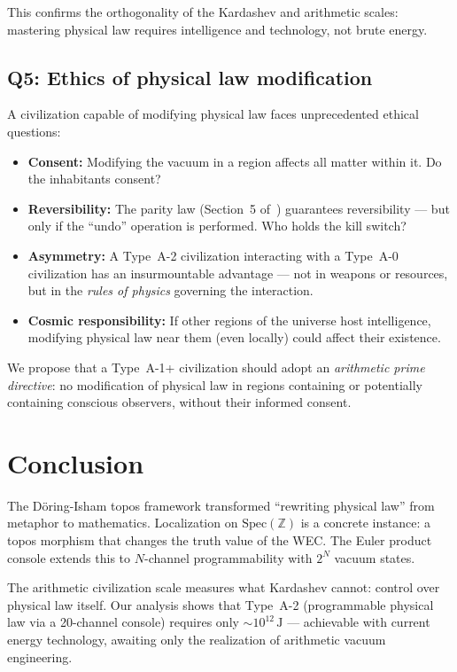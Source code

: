 \documentclass[11pt,a4paper]{article}
\newcommand{\Spec}{\mathrm{Spec}}
\begin{document}
This confirms the orthogonality of the Kardashev and arithmetic
scales: mastering physical law requires intelligence and
technology, not brute energy.

\subsection{Q5: Ethics of physical law modification}

A civilization capable of modifying physical law faces
unprecedented ethical questions:
\begin{itemize}
\item \textbf{Consent:} Modifying the vacuum in a region affects
  all matter within it. Do the inhabitants consent?
\item \textbf{Reversibility:} The parity law (Section~5 of~\cite{paper_J})
  guarantees reversibility --- but only if the ``undo'' operation
  is performed. Who holds the kill switch?
\item \textbf{Asymmetry:} A Type~A-2 civilization interacting with
  a Type~A-0 civilization has an insurmountable advantage ---
  not in weapons or resources, but in the \emph{rules of physics}
  governing the interaction.
\item \textbf{Cosmic responsibility:} If other regions of the
  universe host intelligence, modifying physical law near them
  (even locally) could affect their existence.
\end{itemize}

We propose that a Type~A-1+ civilization should adopt an
\emph{arithmetic prime directive}: no modification of physical
law in regions containing or potentially containing conscious
observers, without their informed consent.

\section{Conclusion}

The D\"oring-Isham topos framework transformed ``rewriting
physical law'' from metaphor to mathematics. Localization on
$\Spec(\mathbb{Z})$ is a concrete instance: a topos morphism
that changes the truth value of the WEC. The Euler product
console extends this to $N$-channel programmability with
$2^N$ vacuum states.

The arithmetic civilization scale measures what Kardashev
cannot: control over physical law itself. Our analysis shows
that Type~A-2 (programmable physical law via a 20-channel console)
requires only $\sim 10^{12}\,\mathrm{J}$ --- achievable with
current energy technology, awaiting only the realization of
arithmetic vacuum engineering.
\end{document}
